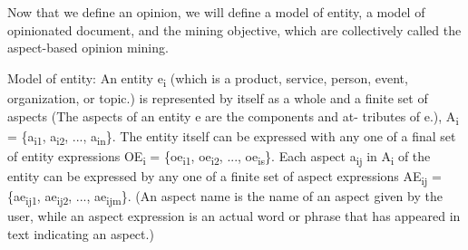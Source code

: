 Now that we define an opinion, we will define a model of entity, a model of opinionated document, and the mining objective, which are collectively called the aspect-based opinion mining.

Model of entity: An entity e\textsubscript{i} (which is a product, service, person, event, organization, or topic.) is represented by itself as a whole and a finite set of aspects (The aspects of an entity e are the components and at- tributes of e.), A\textsubscript{i} = \{a\textsubscript{i1}, a\textsubscript{i2}, ..., a\textsubscript{in}\}. The entity itself can be expressed with any one of a final set of entity expressions OE\textsubscript{i} = \{oe\textsubscript{i1}, oe\textsubscript{i2}, ..., oe\textsubscript{is}\}. Each aspect a\textsubscript{ij} in A\textsubscript{i} of the entity can be expressed by any one of a finite set of aspect expressions AE\textsubscript{ij} = \{ae\textsubscript{ij1}, ae\textsubscript{ij2}, ..., ae\textsubscript{ijm}\}. (An aspect name is the name of an aspect given by the user, while an aspect expression is an actual word or phrase that has appeared in text indicating an aspect.)


